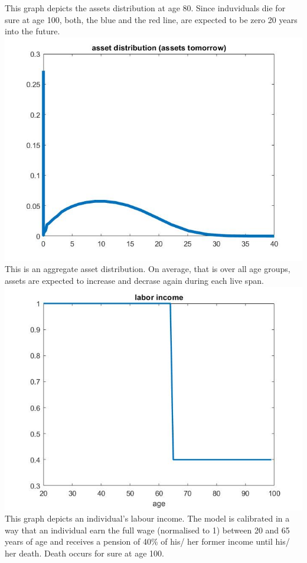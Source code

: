 \documentclass[12pt,a4paper]{article}
\begin{document}
This graph depicts the assets distribution at age 80. Since induviduals die for sure at age 100, both, the blue and the red line, are expected to be zero 20 years into the future.\\
\includegraphics[width=14cm]{Graphs/Figure6} \\
This is an aggregate asset distribution. On average, that is over all age groups, assets are expected to increase and decrase again during each live span.\\
\includegraphics[width=14cm]{Graphs/Figure7} \\
This graph depicts an individual's labour income. The model is calibrated in a way that an individual earn the full wage (normalised to 1) between 20 and 65 years of age and receives a pension of 40\% of his/ her former income until his/ her death. Death occurs for sure at age 100.\\
\end{document}
